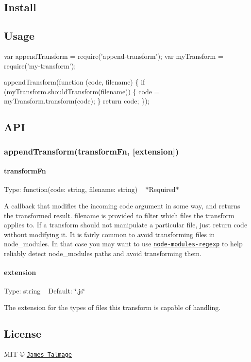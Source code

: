 \subsection*{Install}




\subsection*{Usage}


\begin{DoxyCode}
var appendTransform = require('append-transform');
var myTransform = require('my-transform');

appendTransform(function (code, filename) \{
  if (myTransform.shouldTransform(filename)) \{
    code = myTransform.transform(code);
  \}
  return code;
\});
\end{DoxyCode}


\subsection*{A\+PI}

\subsubsection*{append\+Transform(transform\+Fn, \mbox{[}extension\mbox{]})}

\paragraph*{transform\+Fn}

Type\+: {\ttfamily function(code\+: string, filename\+: string)} ~\newline
$\ast$\+Required$\ast$

A callback that modifies the incoming {\ttfamily code} argument in some way, and returns the transformed result. {\ttfamily filename} is provided to filter which files the transform applies to. If a transform should not manipulate a particular file, just return {\ttfamily code} without modifying it. It is fairly common to avoid transforming files in {\ttfamily node\+\_\+modules}. In that case you may want to use \href{https://www.npmjs.com/package/node-modules-regexp}{\tt {\ttfamily node-\/modules-\/regexp}} to help reliably detect {\ttfamily node\+\_\+modules} paths and avoid transforming them.

\paragraph*{extension}

Type\+: {\ttfamily string} ~\newline
Default\+: {\ttfamily \char`\"{}.\+js\char`\"{}}

The extension for the types of files this transform is capable of handling.

\subsection*{License}

M\+IT © \href{http://github.com/jamestalmage}{\tt James Talmage} 